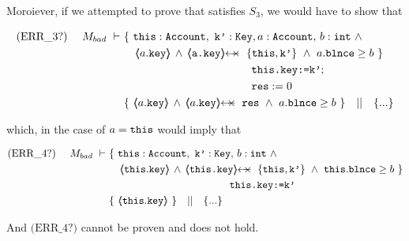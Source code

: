 Moroiever, if we attempted to prove that  satisfies $S_3$, we would have to show that

\small{
\begin{align*}
\text{(ERR\_3?)}  \ \ \ \ M_{bad}\ \vdash \ 
		&	\{  \ \prg{this}:\prg{Account},\ \prg{k'}:\prg{Key}, a:\prg{Account},\, b:\prg{int}\ \wedge \\
  	 &	  \ \ \     \inside{a.\prg{key}}  \, \wedge \,    \protectedFrom {\prg{a.key}} { \{\prg{this},\prg{k'} \} }   
 	  \ \wedge\ a.\prg{\balance}\geq b \ \}  \\
 					& \SPT \SPT   \SPT\SPT  \prg{this.key:=k'}; \\ 
 			& \SPT \SPT   \SPT\SPT \prg{res}:=0 \\  
 	       	& \{ \  \inside{a.\prg{key}}  \, \wedge \, \protectedFrom {a.\prg{key}} {\prg{res}} \ \wedge\  a.\prg{\balance}\geq b \ \}  \ \ \  || \ \ \ 
		   \{ ... \}
\end{align*}
}

which, in the case of $a=\mbox{\normalfont{\texttt{this}}}$ would imply that

\small{
\begin{align*}
\text{(ERR\_4?)}  \ \ \ \ M_{bad}\ \vdash \ 
		&	\{  \ \prg{this}:\prg{Account},\ \prg{k'}:\prg{Key}, \, b:\prg{int}\ \wedge \\
  	 &	  \ \ \     \inside{\prg{this}.\prg{key}}  \, \wedge \,    \protectedFrom {\prg{\prg{this}.key}} { \{\prg{this},\prg{k'} \} }   
 	  \ \wedge\ \prg{this}.\prg{\balance}\geq b \ \}  \\
 					& \SPT \SPT   \SPT\SPT  \prg{this.key:=k'} \\
 	& \{ \  \inside{\prg{this}.\prg{key}}     \ \}  \ \ \  || \ \ \ 
		   \{ ... \}
\end{align*}
}

And  $\text{(ERR\_4?)}$ cannot be proven and does not hold.


